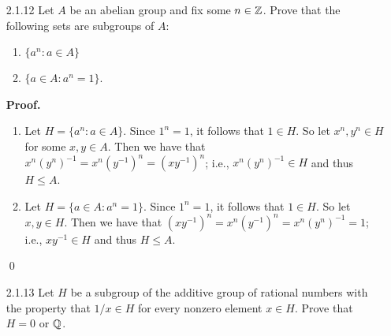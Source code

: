 \begin{enumerate}
      \textbf{Proof.}

      \begin{enumerate}
         \item Let $H = \{(a, 1) : a \in A\}$. We have $(1, 1) \in H$, so that
               $H$ is nonempty. Now let $(x, 1), (y, 1) \in H$. It follows that
               $(x, 1)(y, 1)^{-1} = (x, 1)(y^{-1}, 1) = (xy^{-1}, 1) \in H$, so 
               that $H \le A \times B$.
         \item Let $H = \{(1, b) : b \in B\}$. We have $(1, 1) \in H$, so that
               $H$ is nonempty. Now let $(1, x), (1, y) \in H$. It follows that 
               $(1, x)(1, y)^{-1} = (1, x)(1, y^{-1}) = (1, xy^{-1}) \in H$, so 
               that $H \le A \times B$.
         \item Let $H = \{(a, a) : a \in A\}$. We have $(1, 1) \in H$, so that
               $H$ is nonempty. Now let $(x, x), (y, y) \in H$. It follows that 
               $(x, x)(y, y)^{-1} = (x, x)(y^{-1}, y^{-1}) = (xy^{-1}, xy^{-1}) 
               \in H$, so that $H \le A \times A$.
      \end{enumerate} \qed
   \item[2.1.12]  Let $A$ be an abelian group and fix some $n \in \mathbb{Z}$. Prove
                  that the following sets are subgroups of $A$:
                  \begin{enumerate}
                     \item $\{a^n : a \in A\}$
                     \item $\{a \in A : a^n = 1\}$.
                  \end{enumerate}

      \textbf{Proof.}

      \begin{enumerate}
         \item Let $H = \{a^n : a \in A\}$. Since $1^n = 1$, it follows that
               $1 \in H$. So let $x^n, y^n \in H$ for some $x, y \in A$. Then we 
               have that $x^n(y^n)^{-1} = x^n(y^{-1})^n = (xy^{-1})^n$; i.e.,
               $x^n(y^n)^{-1} \in H$ and thus $H \le A$.
         \item Let $H = \{a \in A : a^n=1\}$. Since $1^n = 1$, it follows that
               $1 \in H$. So let $x, y \in H$. Then we have that
               $(xy^{-1})^n = x^n(y^{-1})^n = x^n(y^n)^{-1} = 1$; i.e.,
               $xy^{-1} \in H$ and thus $H \le A$.
      \end{enumerate} \qed
   \item[2.1.13]  Let $H$ be a subgroup of the additive group of rational
                  numbers with the property that $1/x \in H$ for every nonzero
                  element $x \in H$. Prove that $H = 0$ or $\mathbb{Q}$.


\end{enumerate}
